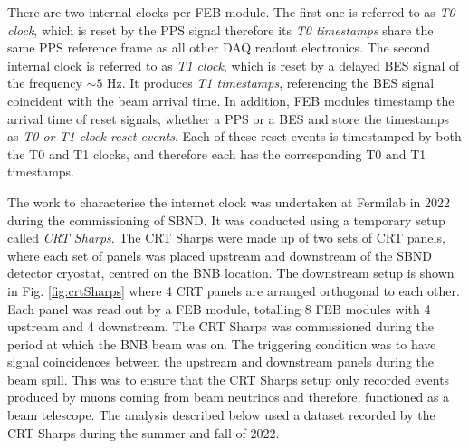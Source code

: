 There are two internal clocks per FEB module.
The first one is referred to as \textit{T0 clock}, which is reset by the PPS signal therefore its \textit{T0 timestamps} share the same PPS reference frame as all other DAQ readout electronics.
The second internal clock is referred to as \textit{T1 clock}, which is reset by a delayed BES signal of the frequency $\sim 5$ Hz. 
It produces \textit{T1 timestamps}, referencing the BES signal coincident with the beam arrival time.
In addition, FEB modules timestamp the arrival time of reset signals, whether a PPS or a BES and store the timestamps as \textit{T0 or T1 clock reset events}.
Each of these reset events is timestamped by both the T0 and T1 clocks, and therefore each has the corresponding T0 and T1 timestamps.




The work to characterise the internet clock was undertaken at Fermilab in 2022 during the commissioning of SBND.
It was conducted using a temporary setup called \textit{CRT Sharps}.
The CRT Sharps were made up of two sets of CRT panels, where each set of panels was placed upstream and downstream of the SBND detector cryostat, centred on the BNB location.
The downstream setup is shown in Fig. \ref{fig:crtSharps} where 4 CRT panels are arranged orthogonal to each other.
Each panel was read out by a FEB module, totalling 8 FEB modules with 4 upstream and 4 downstream.
The CRT Sharps was commissioned during the period at which the BNB beam was on. 
The triggering condition was to have signal coincidences between the upstream and downstream panels during the beam spill.
This was to ensure that the CRT Sharps setup only recorded events produced by muons coming from beam neutrinos and therefore, functioned as a beam telescope.
The analysis described below used a dataset recorded by the CRT Sharps during the summer and fall of 2022.

